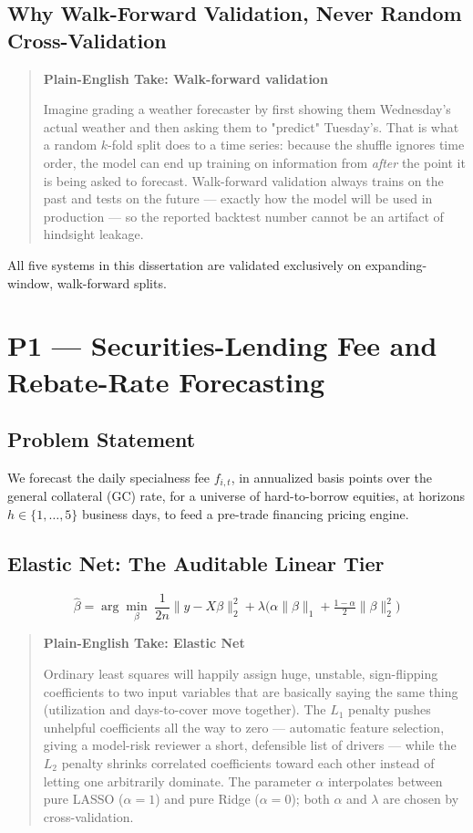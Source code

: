 \documentclass[11pt]{report}
\newenvironment{feynman}[1]{%
  \begin{quote}\small\color{black}
  \colorbox{feynman}{\parbox{0.97\linewidth}{\vspace{2pt}\textbf{\color{navy}Plain-English Take: #1}\\[2pt]
}}
}{\end{quote}}
\begin{document}
\section{Why Walk-Forward Validation, Never Random Cross-Validation}
\begin{feynman}{Walk-forward validation}
Imagine grading a weather forecaster by first showing them Wednesday's actual weather and then asking
them to "predict" Tuesday's. That is what a random $k$-fold split does to a time series: because the
shuffle ignores time order, the model can end up training on information from \emph{after} the point
it is being asked to forecast. Walk-forward validation always trains on the past and tests on the
future — exactly how the model will be used in production — so the reported backtest number cannot be
an artifact of hindsight leakage.
\end{feynman}
All five systems in this dissertation are validated exclusively on expanding-window, walk-forward
splits.

\chapter{P1 --- Securities-Lending Fee and Rebate-Rate Forecasting}

\section{Problem Statement}
We forecast the daily specialness fee $f_{i,t}$, in annualized basis points over the general
collateral (GC) rate, for a universe of hard-to-borrow equities, at horizons $h \in \{1,\dots,5\}$
business days, to feed a pre-trade financing pricing engine.

\section{Elastic Net: The Auditable Linear Tier}
\begin{equation}
\hat\beta = \arg\min_{\beta}\; \frac{1}{2n}\lVert y - X\beta \rVert_2^2 + \lambda\Big(\alpha\lVert\beta\rVert_1 + \tfrac{1-\alpha}{2}\lVert\beta\rVert_2^2\Big)
\end{equation}
\begin{feynman}{Elastic Net}
Ordinary least squares will happily assign huge, unstable, sign-flipping coefficients to two input
variables that are basically saying the same thing (utilization and days-to-cover move together). The
$L_1$ penalty pushes unhelpful coefficients all the way to zero — automatic feature selection, giving
a model-risk reviewer a short, defensible list of drivers — while the $L_2$ penalty shrinks correlated
coefficients toward each other instead of letting one arbitrarily dominate. The parameter $\alpha$
interpolates between pure LASSO ($\alpha=1$) and pure Ridge ($\alpha=0$); both $\alpha$ and $\lambda$
are chosen by cross-validation.
\end{feynman}
\end{document}
